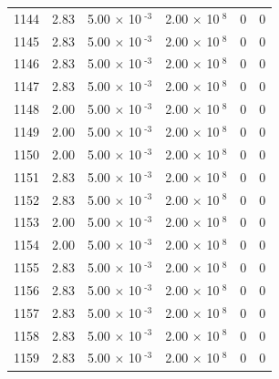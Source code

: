 \documentclass[a4paper,11pt]{article}
\begin{document}
\begin{center}
\begin{longtable}{|R{1.5cm}|R{2.4cm}|R{2.4cm}|R{2.4cm}|R{2.4cm}|R{2.4cm}|}
 1144 &   2.83  &         5.00 $\times$ 10$^{\text{          -3}}$  &         2.00 $\times$ 10$^{\text{           8}}$  & 0  & 0 \\
 1145 &   2.83  &         5.00 $\times$ 10$^{\text{          -3}}$  &         2.00 $\times$ 10$^{\text{           8}}$  & 0  & 0 \\
 1146 &   2.83  &         5.00 $\times$ 10$^{\text{          -3}}$  &         2.00 $\times$ 10$^{\text{           8}}$  & 0  & 0 \\
 1147 &   2.83  &         5.00 $\times$ 10$^{\text{          -3}}$  &         2.00 $\times$ 10$^{\text{           8}}$  & 0  & 0 \\
 1148 &   2.00  &         5.00 $\times$ 10$^{\text{          -3}}$  &         2.00 $\times$ 10$^{\text{           8}}$  & 0  & 0 \\
 1149 &   2.00  &         5.00 $\times$ 10$^{\text{          -3}}$  &         2.00 $\times$ 10$^{\text{           8}}$  & 0  & 0 \\
 1150 &   2.00  &         5.00 $\times$ 10$^{\text{          -3}}$  &         2.00 $\times$ 10$^{\text{           8}}$  & 0  & 0 \\
 1151 &   2.83  &         5.00 $\times$ 10$^{\text{          -3}}$  &         2.00 $\times$ 10$^{\text{           8}}$  & 0  & 0 \\
 1152 &   2.83  &         5.00 $\times$ 10$^{\text{          -3}}$  &         2.00 $\times$ 10$^{\text{           8}}$  & 0  & 0 \\
 1153 &   2.00  &         5.00 $\times$ 10$^{\text{          -3}}$  &         2.00 $\times$ 10$^{\text{           8}}$  & 0  & 0 \\
 1154 &   2.00  &         5.00 $\times$ 10$^{\text{          -3}}$  &         2.00 $\times$ 10$^{\text{           8}}$  & 0  & 0 \\
 1155 &   2.83  &         5.00 $\times$ 10$^{\text{          -3}}$  &         2.00 $\times$ 10$^{\text{           8}}$  & 0  & 0 \\
 1156 &   2.83  &         5.00 $\times$ 10$^{\text{          -3}}$  &         2.00 $\times$ 10$^{\text{           8}}$  & 0  & 0 \\
 1157 &   2.83  &         5.00 $\times$ 10$^{\text{          -3}}$  &         2.00 $\times$ 10$^{\text{           8}}$  & 0  & 0 \\
 1158 &   2.83  &         5.00 $\times$ 10$^{\text{          -3}}$  &         2.00 $\times$ 10$^{\text{           8}}$  & 0  & 0 \\
 1159 &   2.83  &         5.00 $\times$ 10$^{\text{          -3}}$  &         2.00 $\times$ 10$^{\text{           8}}$  & 0  & 0 \\

\end{longtable}
\end{center}
\end{document}
